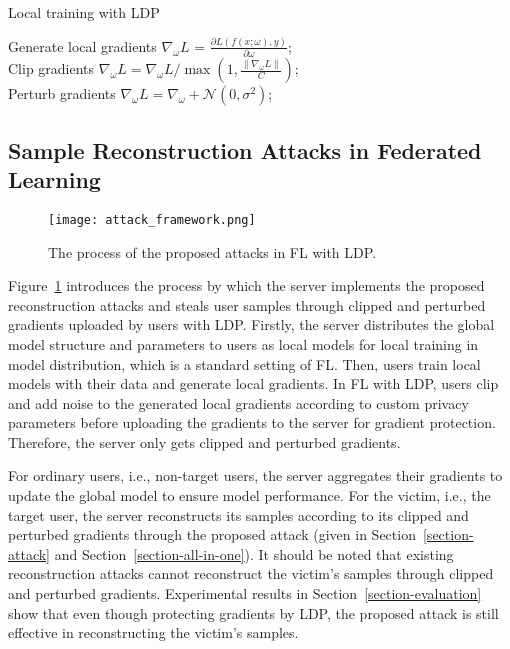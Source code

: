 \documentclass[lettersize,journal]{IEEEtran}
\begin{document}
\begin{algorithm}
\caption{Local training with LDP}
\label{alg-noising-gradients}
Generate local gradients $\nabla_{\omega} L$ = $\frac{\partial L\left( f\left(x;\omega \right), y \right)}{\partial \omega}$; \\
Clip gradients $\nabla_{\omega} L = \nabla_\omega L / \max \left(1 , \frac{\| \nabla_\omega L \|}{C} \right)$;\\
Perturb gradients $\nabla_{\omega} L = \nabla_\omega + \mathcal{N}\left(0, \sigma^2\right)$;\\
\end{algorithm}

\subsection{Sample Reconstruction Attacks in Federated Learning}

\begin{figure}
\centering
\texttt{[image: attack\_framework.png]}
\caption{The process of the proposed attacks in FL with LDP.}
\label{fig-reconstruction-attack-process}
\end{figure}

Figure~\ref{fig-reconstruction-attack-process} introduces the process by which the server implements the proposed reconstruction attacks and steals user samples through clipped and perturbed gradients uploaded by users with LDP. Firstly, the server distributes the global model structure and parameters to users as local models for local training in model distribution, which is a standard setting of FL. Then, users train local models with their data and generate local gradients. In FL with LDP, users clip and add noise to the generated local gradients according to custom privacy parameters before uploading the gradients to the server for gradient protection. Therefore, the server only gets clipped and perturbed gradients.

For ordinary users, i.e., non-target users, the server aggregates their gradients to update the global model to ensure model performance. For the victim, i.e., the target user, the server reconstructs its samples according to its clipped and perturbed gradients through the proposed attack (given in Section~\ref{section-attack} and Section~\ref{section-all-in-one}). It should be noted that existing reconstruction attacks cannot reconstruct the victim's samples through clipped and perturbed gradients. Experimental results in Section~\ref{section-evaluation} show that even though protecting gradients by LDP, the proposed attack is still effective in reconstructing the victim's samples.
\end{document}
